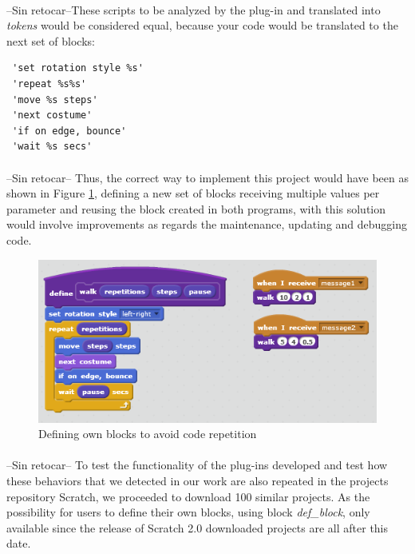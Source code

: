 \documentclass[a4paper,10pt]{article}
\begin{document}
\paragraph{}--Sin retocar--These scripts to be analyzed by the plug-in and translated into \textit{tokens} would be considered equal, because your code would be translated to the next set of blocks:
\begin{verbatim}
 'set rotation style %s'
 'repeat %s%s'
 'move %s steps'
 'next costume'
 'if on edge, bounce'
 'wait %s secs'
\end{verbatim}
\paragraph{} --Sin retocar-- Thus, the correct way to implement this project would have been as shown in Figure \ref{fig:CodeRepetition2}, defining a new set of blocks receiving multiple values per parameter and reusing the block created 	in both programs, with this solution would involve improvements as regards the maintenance, updating and debugging code.

\begin{figure}
  \centering
    \includegraphics{img/CodeRepetition2.png}
  \caption{Defining own blocks to avoid code repetition}
  \label{fig:CodeRepetition2}
\end{figure}

\paragraph{}--Sin retocar-- To test the functionality of the plug-ins developed and test how these behaviors that we detected in our work are also repeated in the projects repository Scratch, we proceeded to download 100 similar projects. As the possibility for users to define their own blocks, using block \textit{def\_block}, only available since the release of Scratch 2.0 downloaded projects are all after this date.
\end{document}
